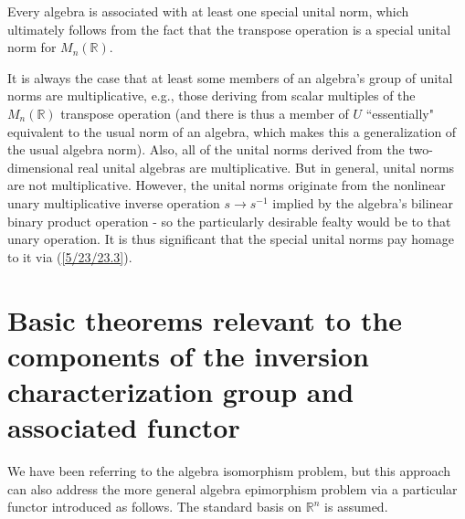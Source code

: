 \documentclass{amsart}
\numberwithin{equation}{section}
\theoremstyle{definition}
\numberwithin{theorem}{section}
\begin{document}
Every algebra is associated with at least one special unital norm, which ultimately follows from the fact that the transpose operation is a special unital norm for $M_n(\mathbb{R})$.

It is always the case that at least some members of an algebra's group of unital norms are multiplicative, e.g., those deriving from scalar multiples of the $M_n(\mathbb{R})$ transpose operation (and there is thus a member of $ U$ ``essentially" equivalent to the usual norm of an algebra, which makes this a generalization of the usual algebra norm).  Also, all of the unital norms derived from the two-dimensional real unital algebras are multiplicative.   But in general, unital norms are not multiplicative.  However, the unital norms originate from the nonlinear unary multiplicative inverse operation $s\rightarrow s^{-1}$ implied by the algebra's bilinear binary product operation - so the particularly desirable fealty would be to that unary operation.  It is thus significant that the special unital norms pay homage to it via (\ref{5/23/23.3}). 



\section{Basic theorems relevant to the components of the inversion characterization group and associated functor}

We have been referring to the algebra isomorphism problem, but this approach can also address the more general algebra epimorphism problem via a particular functor introduced as follows.  The standard basis on $\mathbb{R}^n$ is assumed. 
\end{document}
